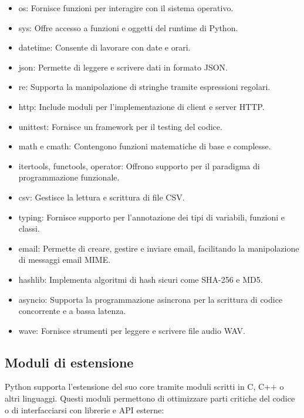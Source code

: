 \documentclass[
  letterpaper,
  DIV=11,
  numbers=noendperiod]{scrreprt}
\providecommand{\tightlist}{%
  \setlength{\itemsep}{0pt}\setlength{\parskip}{0pt}}\usepackage{longtable,booktabs,array}
\begin{document}
\begin{itemize}
\tightlist
\item
  os: Fornisce funzioni per interagire con il sistema operativo.
\item
  sys: Offre accesso a funzioni e oggetti del runtime di Python.
\item
  datetime: Consente di lavorare con date e orari.
\item
  json: Permette di leggere e scrivere dati in formato JSON.
\item
  re: Supporta la manipolazione di stringhe tramite espressioni
  regolari.
\item
  http: Include moduli per l'implementazione di client e server HTTP.
\item
  unittest: Fornisce un framework per il testing del codice.
\item
  math e cmath: Contengono funzioni matematiche di base e complesse.
\item
  itertools, functools, operator: Offrono supporto per il paradigma di
  programmazione funzionale.
\item
  csv: Gestisce la lettura e scrittura di file CSV.
\item
  typing: Fornisce supporto per l'annotazione dei tipi di variabili,
  funzioni e classi.
\item
  email: Permette di creare, gestire e inviare email, facilitando la
  manipolazione di messaggi email MIME.
\item
  hashlib: Implementa algoritmi di hash sicuri come SHA-256 e MD5.
\item
  asyncio: Supporta la programmazione asincrona per la scrittura di
  codice concorrente e a bassa latenza.
\item
  wave: Fornisce strumenti per leggere e scrivere file audio WAV.
\end{itemize}

\subsection{Moduli di estensione}\label{moduli-di-estensione}

Python supporta l'estensione del suo core tramite moduli scritti in C,
C++ o altri linguaggi. Questi moduli permettono di ottimizzare parti
critiche del codice o di interfacciarsi con librerie e API esterne:
\end{document}
